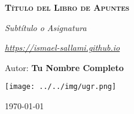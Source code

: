 \begin{titlepage}
    

    \begin{center}
        \vspace*{2cm}
        
        {\Huge \bfseries\scshape Título del Libro de Apuntes \par}
        \vspace{0.5cm}
        {\Large \itshape Subtítulo o Asignatura \par}
        \vspace{0.5cm}
        {\Large \itshape \href{https://ismael-sallami.github.io}{https://ismael-sallami.github.io} \par}


        \vfill
        
        {\LARGE Autor: \textbf{Tu Nombre Completo} \par}
        \vspace{0.3cm}
        
        \vspace{1cm}
        \texttt{[image: ../../img/ugr.png]} %
        \vspace{1cm}
        
        {\large \today}
    \end{center}
    
    \restoregeometry
\end{titlepage}
